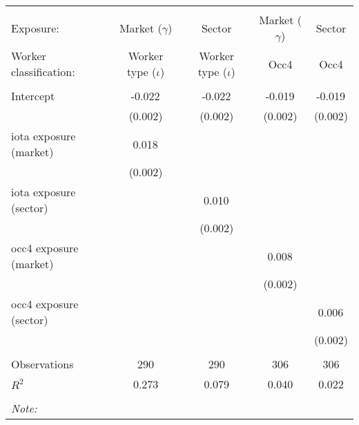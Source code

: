 \begin{tabular}{@{\extracolsep{5pt}}lcccc}
\\[-1.8ex]\hline
\hline \\[-1.8ex]
\hline \\[-1.8ex]
 Exposure: & Market ($\gamma$) & Sector & Market ($\gamma$) & Sector \\
 Worker classification: & Worker type ($\iota$) & Worker type ($\iota$) & Occ4 & Occ4 \\
 \hline &  &  &  &  \\
 Intercept & -0.022$^{}$ & -0.022$^{}$ & -0.019$^{}$ & -0.019$^{}$ \\
  & (0.002) & (0.002) & (0.002) & (0.002) \\
 iota exposure (market) & 0.018$^{}$ & & & \\
  & (0.002) & & & \\
 iota exposure (sector) & & 0.010$^{}$ & & \\
  & & (0.002) & & \\
 occ4 exposure (market) & & & 0.008$^{}$ & \\
  & & & (0.002) & \\
 occ4 exposure (sector) & & & & 0.006$^{}$ \\
  & & & & (0.002) \\
\hline \\[-1.8ex]
 Observations & 290 & 290 & 306 & 306 \\
 $R^2$ & 0.273 & 0.079 & 0.040 & 0.022 \\
\hline
\hline \\[-1.8ex]
\textit{Note:}\end{tabular}